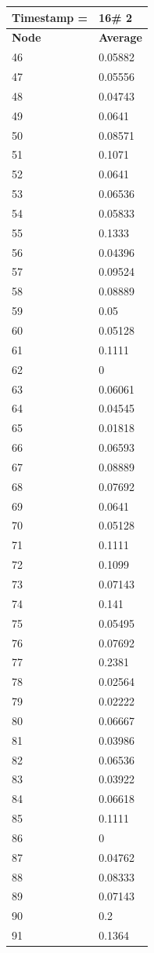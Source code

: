 \begin{tabular}{|l||l|}
\hline
\textbf{Timestamp =} & \textbf{16}\# 2\\\hline
	\textbf{Node} & \textbf{Average} \\ \hline
\hline
	46 & 0.05882 \\ \hline
	47 & 0.05556 \\ \hline
	48 & 0.04743 \\ \hline
	49 & 0.0641 \\ \hline
	50 & 0.08571 \\ \hline
	51 & 0.1071 \\ \hline
	52 & 0.0641 \\ \hline
	53 & 0.06536 \\ \hline
	54 & 0.05833 \\ \hline
	55 & 0.1333 \\ \hline
	56 & 0.04396 \\ \hline
	57 & 0.09524 \\ \hline
	58 & 0.08889 \\ \hline
	59 & 0.05 \\ \hline
	60 & 0.05128 \\ \hline
	61 & 0.1111 \\ \hline
	62 & 0 \\ \hline
	63 & 0.06061 \\ \hline
	64 & 0.04545 \\ \hline
	65 & 0.01818 \\ \hline
	66 & 0.06593 \\ \hline
	67 & 0.08889 \\ \hline
	68 & 0.07692 \\ \hline
	69 & 0.0641 \\ \hline
	70 & 0.05128 \\ \hline
	71 & 0.1111 \\ \hline
	72 & 0.1099 \\ \hline
	73 & 0.07143 \\ \hline
	74 & 0.141 \\ \hline
	75 & 0.05495 \\ \hline
	76 & 0.07692 \\ \hline
	77 & 0.2381 \\ \hline
	78 & 0.02564 \\ \hline
	79 & 0.02222 \\ \hline
	80 & 0.06667 \\ \hline
	81 & 0.03986 \\ \hline
	82 & 0.06536 \\ \hline
	83 & 0.03922 \\ \hline
	84 & 0.06618 \\ \hline
	85 & 0.1111 \\ \hline
	86 & 0 \\ \hline
	87 & 0.04762 \\ \hline
	88 & 0.08333 \\ \hline
	89 & 0.07143 \\ \hline
	90 & 0.2 \\ \hline
	91 & 0.1364 \\ \hline
\end{tabular}

